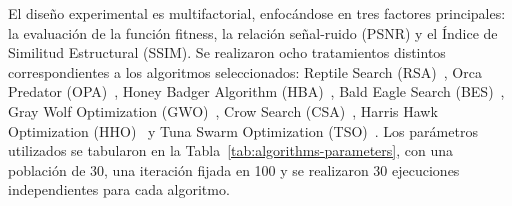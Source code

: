 \documentclass[conference]{IEEEtran}
\begin{document}




\noindent El diseño experimental es multifactorial, enfocándose en tres factores principales: la evaluación de la función fitness, la relación señal-ruido (PSNR) y el Índice de Similitud Estructural (SSIM). Se realizaron ocho tratamientos distintos correspondientes a los algoritmos seleccionados: Reptile Search (RSA)~\cite{Abualigah2022}, Orca Predator (OPA)~\cite{Jiang2022}, Honey Badger Algorithm (HBA)~\cite{Hashim2022}, Bald Eagle Search (BES)~\cite{Alsattar2019}, Gray Wolf Optimization (GWO)~\cite{Mirjalili2014}, Crow Search (CSA)~\cite{Askarzadeh2016}, Harris Hawk Optimization (HHO)~\cite{Heidari2019}  y Tuna Swarm Optimization (TSO)~\cite{Xie2021}. Los parámetros utilizados se tabularon en la Tabla~\ref{tab:algorithms-parameters}, con una población de 30, una iteración fijada en 100 y se realizaron 30 ejecuciones independientes para cada algoritmo.
\end{document}
